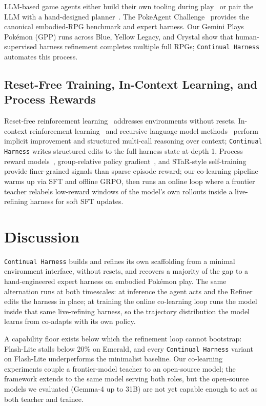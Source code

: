 \documentclass[11pt]{article}
\begin{document}
LLM-based game agents either build their own tooling during play~\citep{wang2023voyager, anthropic2025claudeplays} or pair the LLM with a hand-designed planner~\citep{karten2025pok}. The PokeAgent Challenge~\citep{karten2026pokeagent} provides the canonical embodied-RPG benchmark and expert harness. Our Gemini Plays Pok\'emon (GPP) runs across Blue, Yellow Legacy, and Crystal show that human-supervised harness refinement completes multiple full RPGs; \texttt{Continual Harness} automates this process.

\subsection{Reset-Free Training, In-Context Learning, and Process Rewards}

Reset-free reinforcement learning~\citep{gupta2021reset} addresses environments without resets. In-context reinforcement learning~\citep{song2025reward, karten2025llm} and recursive language model methods~\citep{zhang2025recursive, yao2022react} perform implicit improvement and structured multi-call reasoning over context; \texttt{Continual Harness} writes structured edits to the full harness state at depth 1. Process reward models~\citep{wang2026openclawrl, lightman2023let}, group-relative policy gradient~\citep{shao2024deepseekmath}, and STaR-style self-training~\citep{zelikman2022star} provide finer-grained signals than sparse episode reward; our co-learning pipeline warms up via SFT and offline GRPO, then runs an online loop where a frontier teacher relabels low-reward windows of the model's own rollouts inside a live-refining harness for soft SFT updates.


\section{Discussion}\label{sec:discussion}

\texttt{Continual Harness} builds and refines its own scaffolding from a minimal environment interface, without resets, and recovers a majority of the gap to a hand-engineered expert harness on embodied Pok\'{e}mon play. The same alternation runs at both timescales: at inference the agent acts and the Refiner edits the harness in place; at training the online co-learning loop runs the model inside that same live-refining harness, so the trajectory distribution the model learns from co-adapts with its own policy.

A capability floor exists below which the refinement loop cannot bootstrap: Flash-Lite stalls below $20\%$ on Emerald, and every \texttt{Continual Harness} variant on Flash-Lite underperforms the minimalist baseline. Our co-learning experiments couple a frontier-model teacher to an open-source model; the framework extends to the same model serving both roles, but the open-source models we evaluated (Gemma-4 up to 31B) are not yet capable enough to act as both teacher and trainee.
\end{document}
